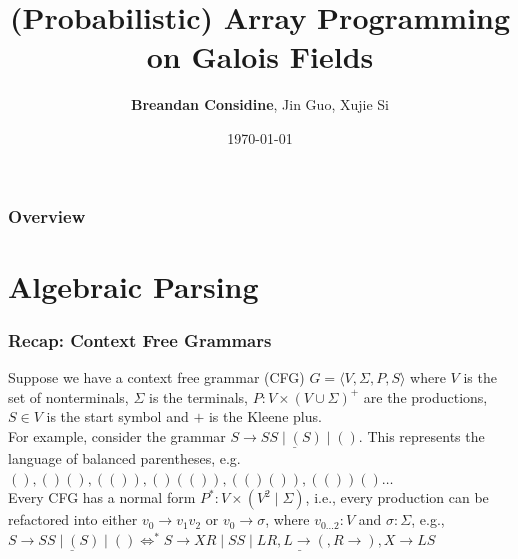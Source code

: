\documentclass{beamer}
\title[Array Programming on $GF(2^n)$]{(Probabilistic) Array Programming on Galois Fields}
\author[Considine, Guo, Si]{\textbf{Breandan Considine}, Jin Guo, Xujie Si}
\institute[McGill]{
    McGill University, Mila IQIA\\
    \medskip
    \textit{breandan.considine@mail.mcgill.ca}
}
\date{\today}
\begin{document}
    \begin{frame}
        \titlepage
    \end{frame}

    \begin{frame}
        \frametitle{Overview}
        \tableofcontents
    \end{frame}

    \section{Algebraic Parsing}\label{sec:algebraic-parsing}


    \begin{frame}
        \frametitle{Recap: Context Free Grammars}
        Suppose we have a context free grammar (CFG) $G = \langle V, \Sigma, P, S\rangle$ where $V$ is the set of nonterminals, $\Sigma$ is the terminals, $P: V\times (V \cup \Sigma)^+$ are the productions, $S\in V$ is the start symbol and $+$ is the Kleene plus.\newline\\
        For example, consider the grammar $\underline{S \rightarrow S S \mid ( S ) \mid ()}$. This represents the language of balanced parentheses, e.g. $(), ()(), (()), ()(()), (()()), (())()\ldots$\newline\\
        Every CFG has a normal form $P^*: V \times (V^2 \mid \Sigma)$, i.e., every production can be refactored into either $v_0 \rightarrow v_1 v_2$ or $v_0 \rightarrow \sigma$, where $v_{0\ldots2}: V$ and $\sigma: \Sigma$, e.g., $\underline{S \rightarrow S S \mid ( S ) \mid ()}\Leftrightarrow^*\underline{S\rightarrow XR \mid SS \mid LR, L \rightarrow (, R \rightarrow ), X\rightarrow LS}$


\end{frame}
\end{document}
